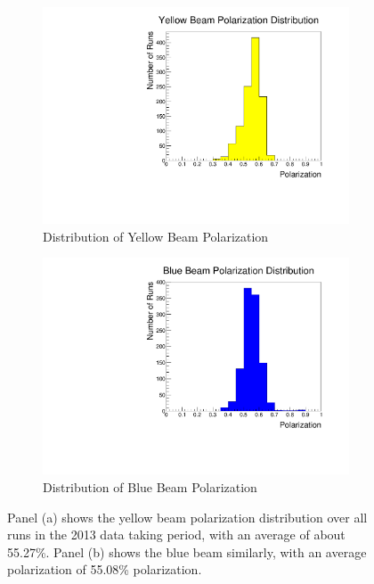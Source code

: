 \begin{figure}[H]
	\centering
	\begin{subfigure}[t]{0.5\textwidth}
		\centering
		\includegraphics[width=0.95\linewidth]{./figures/yell_polarization.pdf}
		\caption{Distribution of Yellow Beam Polarization}
		\label{fig:pol_yell}
	\end{subfigure}%
  \begin{subfigure}[t]{0.5\textwidth}
		\centering
		\includegraphics[width=0.95\linewidth]{./figures/blue_polarization.pdf}
    \caption{Distribution of Blue Beam Polarization}
		\label{fig:pol_blue}
	\end{subfigure}
	\caption{ 
    Panel (a) shows the yellow beam polarization distribution over all runs in
    the 2013 data taking period, with an average of about 55.27\%. Panel (b)
    shows the blue beam similarly, with an average polarization of 55.08\%
    polarization.
  }
	\label{fig:pol_distribution}
\end{figure}

